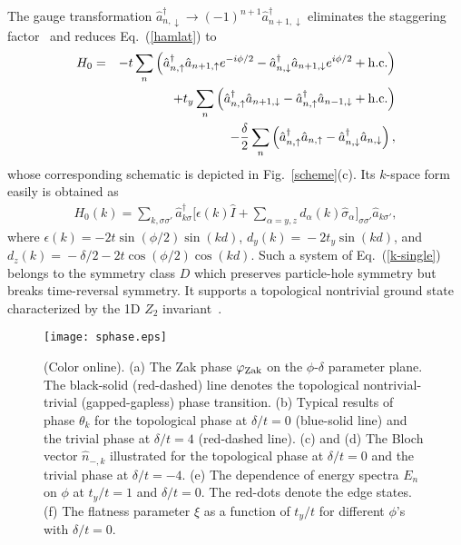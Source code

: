 \documentclass[twocolumn,prl,superscriptaddress,amsmath,amssymb]{revtex4} %
\begin{document}
The gauge transformation $\hat{a}_{{{n}},\downarrow}^{\dag}\rightarrow(-1)^{n+1} \hat{a}_{{{n+1}},\downarrow}^{\dag}$ eliminates the staggering factor~\cite{Liu14} and reduces Eq.~(\ref{hamlat}) to
\begin{eqnarray}
{H}_0 &= &- t \sum_n
\left(\hat{a}^\dag_{n,\uparrow}  \hat{a}_{n+1,\uparrow} e^{-i\phi/2}-\hat{a}^\dag_{n,\downarrow}\hat{a}_{n+1,\downarrow}e^{i\phi/2}
+{\rm{h.c.}}\right) \nonumber \\
& & + t_y \sum_n
\left(\hat{a}^\dag_{n,\uparrow}\hat{a}_{n+1,\downarrow}-
\hat{a}^\dag_{n,\uparrow}\hat{a}_{n-1,\downarrow} +
{\rm{h.c.}}\right)\nonumber \\
& & - \frac{\delta}{2} \sum_n
\left(\hat{a}^\dag_{n,\uparrow}\hat{a}_{n,\uparrow}
-\hat{a}^\dag_{n,\downarrow}\hat{a}_{n,\downarrow}\right),
\label{gau-hamlat}
\end{eqnarray}
whose corresponding schematic is depicted in Fig.~\ref{scheme}(c). Its $k$-space form easily is obtained as
\begin{eqnarray}
H_{0}({{k}})=\sum_{{{k}},\sigma\sigma'}\hat{a}_{{{k}} \sigma}^{\dag}\Big[\epsilon({{k}})\hat{I}+\sum_{\alpha=y,z}d_{\alpha}({{k}}) \hat{\sigma}_{\alpha}\Big]_{\sigma\sigma'}\hat{a}_{{{k}}\sigma'},\label{k-single}
\end{eqnarray}
where $\epsilon({{k}})=-2t\sin(\phi/2)\sin(kd)$, $d_{y}({{k}})\!=\!-2t_{y}\sin(kd)$, and $d_{z}({{k}})\!=\!-\delta/2-2t\cos(\phi/2)\cos(kd)$. Such a system of Eq.~(\ref{k-single}) belongs to the symmetry class $D$ which preserves particle-hole symmetry but breaks time-reversal symmetry. It supports a topological nontrivial ground state characterized by the 1D $Z_2$ invariant~\cite{AZ,Ludwig08}.

\begin{figure}[ht]
\texttt{[image: sphase.eps]}
\caption{(Color online). (a) The Zak phase $\varphi_{\rm{Zak}}$ on the $\phi$-$\delta$ parameter plane. The black-solid (red-dashed) line denotes the topological nontrivial-trivial (gapped-gapless) phase transition. (b) Typical results of phase $\theta_k$ for the topological phase at $\delta/t=0$ (blue-solid line) and the trivial phase at $\delta/t=4$ (red-dashed line).
(c) and (d) The Bloch vector $\hat{n}_{-,k}$ illustrated for the topological phase at $\delta/t=0$ and the trivial phase at $\delta/t=-4$. (e) The dependence of energy spectra $E_n$ on $\phi$ at $t_y/t=1$ and $\delta/t=0$. The red-dots denote the edge states. (f) The flatness parameter $\xi$ as a function of $t_y/t$ for different $\phi$'s with $\delta/t=0$.}
\label{sphase}
\end{figure}
\end{document}
